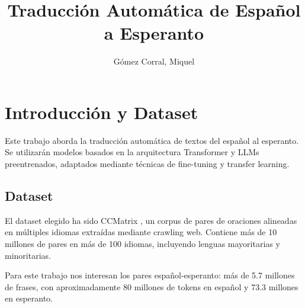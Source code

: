 \documentclass[11pt,spanish,listoffigures,listoftables]{tfgetsinf}
\title{Traducción Automática de Español a Esperanto}
\author{Gómez Corral, Miquel}
\begin{document}
 









\mainmatter

\chapter{Introducción y Dataset}
Este trabajo aborda la traducción automática de textos del español al esperanto. Se utilizarán modelos basados en la arquitectura Transformer y LLMs preentrenados, adaptados mediante técnicas de fine-tuning y transfer learning.

\section{Dataset}
El dataset elegido ha sido CCMatrix \cite{schwenk-2019}, un corpus de pares de oraciones alineadas en múltiples idiomas extraídas mediante crawling web. Contiene más de 10 millones de pares en más de 100 idiomas, incluyendo lenguas mayoritarias y minoritarias.

Para este trabajo nos interesan los pares español-esperanto: más de 5.7 millones de frases, con aproximadamente 80 millones de tokens en español y 73.3 millones en esperanto.
\end{document}
